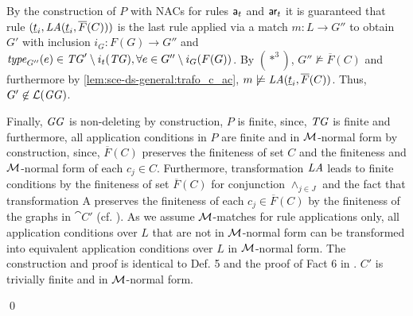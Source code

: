 \begin{itemize}
\begin{enumerate}
    By the construction of $P$ with NACs for rules $\mathsf{a}_t$ and $\mathsf{ar}_t$ it is guaranteed that rule $(\underline{t}_i,\mathit{LA}(\underline{t}_i,\overline{F}(C)))$ is the last rule applied via a match $m\colon L \to G''$ to obtain $G'$ with inclusion $i_G\colon F(G) \to G''$ and $\mathit{type}_{G''}(e) \in \mathit{TG}'\setminus i_t(\mathit{TG}), \forall e \in G'' \setminus i_G(F(G))$.
    By $(*^3)$, $G'' \not\models \overline{F}(C)$ and furthermore by \cref{lem:sce-ds-general:trafo_c_ac}, $m \not\models \mathit{LA}(\underline{t}_i,\overline{F}(C))$.
    Thus, $G' \not\in \mathcal{L}(\mathit{GG})$.
  \end{enumerate}
  Finally, $\mathit{GG}$ is non-deleting by construction, $P$ is finite, since, $\mathit{TG}$ is finite and furthermore, all application conditions in $P$ are finite and in ${\cal M}$-normal form by construction, since, $\overline{F}(C)$ preserves the finiteness of set $C$ and the finiteness and ${\cal M}$-normal form of each $c_j \in C$.
  Furthermore, transformation $\mathit{LA}$ leads to finite conditions by the finiteness of set $\overline{F}(C)$ for conjunction $\wedge_{j \in J}$ and the fact that transformation $\text{A}$ preserves the finiteness of each $c_j \in \overline{F}(C)$ by the finiteness of the graphs in $\cat{C'}$ (cf. \cite{DBLP:journals/mscs/HabelP09}).
  As we assume ${\cal M}$-matches for rule applications only, all application conditions over $L$ that are not in ${\cal M}$-normal form can be transformed into equivalent application conditions over $L$ in ${\cal M}$-normal form.
  The construction and proof is identical to Def. 5 and the proof of Fact 6 in \cite{DBLP:journals/mscs/HabelP09}.
  $C'$ is trivially finite and in ${\cal M}$-normal form.
\end{itemize}
\qed

